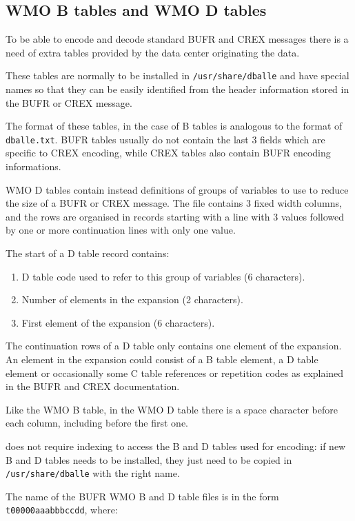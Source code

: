 \subsection{WMO B tables and WMO D tables}

To be able to encode and decode standard BUFR and CREX messages there is a need
of extra tables provided by the data center originating the data.

These tables are normally to be installed in {\tt /usr/share/dballe} and have
special names so that they can be easily identified from the header information
stored in the BUFR or CREX message.

The format of these tables, in the case of B tables is analogous to the format
of {\tt dballe.txt}.  BUFR tables usually do not contain the last 3 fields
which are specific to CREX encoding, while CREX tables also contain BUFR
encoding informations.

WMO D tables contain instead definitions of groups of variables to use to
reduce the size of a BUFR or CREX message.  The file contains 3 fixed width
columns, and the rows are organised in records starting with a line with 3
values followed by one or more continuation lines with only one value.

The start of a D table record contains:

\begin{enumerate}
\item D table code used to refer to this group of variables (6 characters).
\item Number of elements in the expansion (2 characters).
\item First element of the expansion (6 characters).
\end{enumerate}

The continuation rows of a D table only contains one element of the expansion.
An element in the expansion could consist of a B table element, a D table
element or occasionally some C table references or repetition codes as
explained in the BUFR and CREX documentation.

Like the WMO B table, in the WMO D table there is a space character before each
column, including before the first one.

\dballe{} does not require indexing to access the B and D tables used for
encoding: if new B and D tables needs to be installed, they just need to be
copied in {\tt /usr/share/dballe} with the right name.

The name of the BUFR WMO B and D table files is in the form
{\tt t00000aaabbbccdd}, where:

